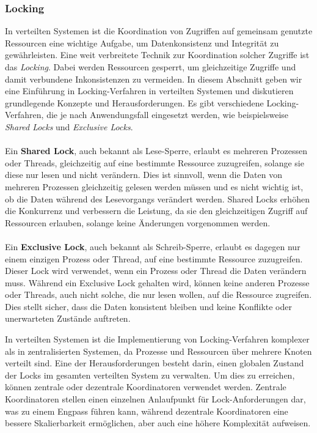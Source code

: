 \documentclass[../vs-script-first-v01.tex]{subfiles}
\begin{document}
\subsubsection{Locking}
In verteilten Systemen ist die Koordination von Zugriffen auf gemeinsam genutzte Ressourcen eine wichtige Aufgabe, um Datenkonsistenz und Integrität zu gewährleisten. Eine weit verbreitete Technik zur Koordination solcher Zugriffe ist das \textit{Locking}. Dabei werden Ressourcen gesperrt, um gleichzeitige Zugriffe und damit verbundene Inkonsistenzen zu vermeiden. In diesem Abschnitt geben wir eine Einführung in Locking-Verfahren in verteilten Systemen und diskutieren grundlegende Konzepte und Herausforderungen.
Es gibt verschiedene Locking-Verfahren, die je nach Anwendungsfall eingesetzt werden, wie beispielsweise \textit{Shared Locks} und \textit{Exclusive Locks}.
\\\\
Ein \textbf{Shared Lock}, auch bekannt als Lese-Sperre, erlaubt es mehreren Prozessen oder Threads, gleichzeitig auf eine bestimmte Ressource zuzugreifen, solange sie diese nur lesen und nicht verändern. Dies ist sinnvoll, wenn die Daten von mehreren Prozessen gleichzeitig gelesen werden müssen und es nicht wichtig ist, ob die Daten während des Lesevorgangs verändert werden. Shared Locks erhöhen die Konkurrenz und verbessern die Leistung, da sie den gleichzeitigen Zugriff auf Ressourcen erlauben, solange keine Änderungen vorgenommen werden.
\\\\
Ein \textbf{Exclusive Lock}, auch bekannt als Schreib-Sperre, erlaubt es dagegen nur einem einzigen Prozess oder Thread, auf eine bestimmte Ressource zuzugreifen. Dieser Lock wird verwendet, wenn ein Prozess oder Thread die Daten verändern muss. Während ein Exclusive Lock gehalten wird, können keine anderen Prozesse oder Threads, auch nicht solche, die nur lesen wollen, auf die Ressource zugreifen. Dies stellt sicher, dass die Daten konsistent bleiben und keine Konflikte oder unerwarteten Zustände auftreten.

In verteilten Systemen ist die Implementierung von Locking-Verfahren komplexer als in zentralisierten Systemen, da Prozesse und Ressourcen über mehrere Knoten verteilt sind. Eine der Herausforderungen besteht darin, einen globalen Zustand der Locks im gesamten verteilten System zu verwalten. Um dies zu erreichen, können zentrale oder dezentrale Koordinatoren verwendet werden. Zentrale Koordinatoren stellen einen einzelnen Anlaufpunkt für Lock-Anforderungen dar, was zu einem Engpass führen kann, während dezentrale Koordinatoren eine bessere Skalierbarkeit ermöglichen, aber auch eine höhere Komplexität aufweisen.
\end{document}
